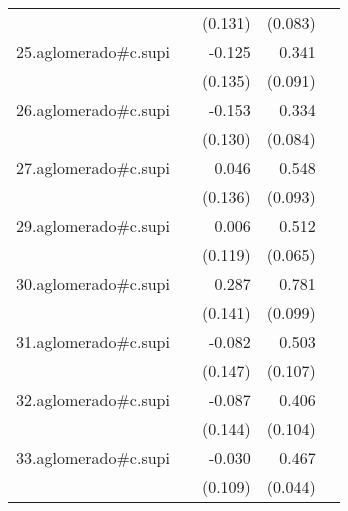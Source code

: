 {\begin{longtable}{l*{4}{D{.}{.}{-1}}}
            &                     &     (0.131)         &     (0.083)         &                     \\
\addlinespace
25.aglomerado#c.supi&                     &      -0.125         &       0.341\sym{***}&                     \\
            &                     &     (0.135)         &     (0.091)         &                     \\
\addlinespace
26.aglomerado#c.supi&                     &      -0.153         &       0.334\sym{***}&                     \\
            &                     &     (0.130)         &     (0.084)         &                     \\
\addlinespace
27.aglomerado#c.supi&                     &       0.046         &       0.548\sym{***}&                     \\
            &                     &     (0.136)         &     (0.093)         &                     \\
\addlinespace
29.aglomerado#c.supi&                     &       0.006         &       0.512\sym{***}&                     \\
            &                     &     (0.119)         &     (0.065)         &                     \\
\addlinespace
30.aglomerado#c.supi&                     &       0.287\sym{*}  &       0.781\sym{***}&                     \\
            &                     &     (0.141)         &     (0.099)         &                     \\
\addlinespace
31.aglomerado#c.supi&                     &      -0.082         &       0.503\sym{***}&                     \\
            &                     &     (0.147)         &     (0.107)         &                     \\
\addlinespace
32.aglomerado#c.supi&                     &      -0.087         &       0.406\sym{***}&                     \\
            &                     &     (0.144)         &     (0.104)         &                     \\
\addlinespace
33.aglomerado#c.supi&                     &      -0.030         &       0.467\sym{***}&                     \\
            &                     &     (0.109)         &     (0.044)         &                     \\

\end{longtable}}
